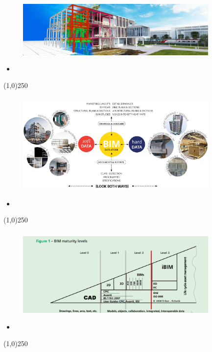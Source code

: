 \begin{frame}
\frametitle{}
\begin{figure}
	\centering
	\includegraphics[width=10cm]{./images/bim-banner-bg-1.jpg}
	\caption[]{}
	\label{fig:}
\end{figure}
\begin{itemize}
	\item 
\end{itemize}
\end{frame}
\begin{center}\line(1,0){250}\end{center}






\begin{frame}
\frametitle{}
\begin{figure}
	\centering
	\includegraphics[width=10cm]{./images/BIM-Data-Store-4.jpg}
	\caption[]{}
	\label{fig:}
\end{figure}
\begin{itemize}
	\item 
\end{itemize}
\end{frame}
\begin{center}\line(1,0){250}\end{center}




\begin{frame}
\frametitle{}
\begin{figure}
	\centering
	\includegraphics[width=10cm]{./images/bimmaturity Levels.jpg}
	\caption[]{}
	\label{fig:}
\end{figure}
\begin{itemize}
	\item 
\end{itemize}
\end{frame}
\begin{center}\line(1,0){250}\end{center}



